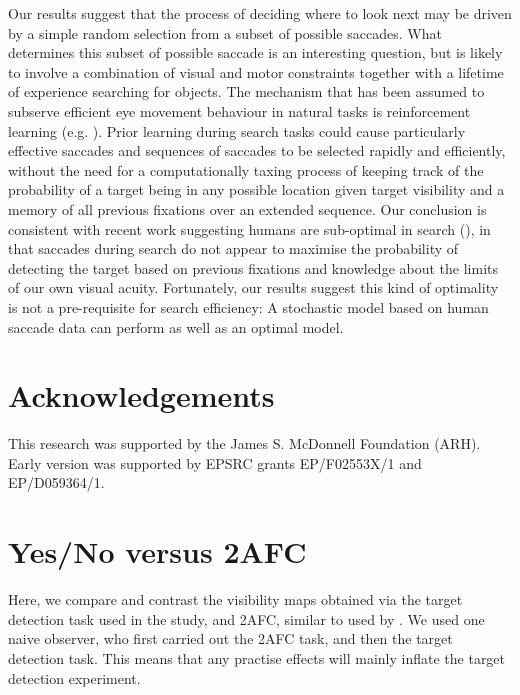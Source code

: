 \documentclass[man]{apa6}
\begin{document}
\par

Our results suggest that the process of deciding where to look next may be driven by a simple random selection from a subset of possible saccades. What determines this subset of possible saccade is an interesting question, but is likely to involve a combination of visual and motor constraints together with a lifetime of experience searching for objects. The mechanism that has been assumed to subserve efficient eye movement behaviour in natural tasks is reinforcement learning (e.g. \textcite{hayhoe2014}). Prior learning during search tasks could cause particularly effective saccades and sequences of saccades to be selected rapidly and efficiently, without the need for a computationally taxing process of keeping track of the probability of a target being in any possible location given target visibility and a memory of all previous fixations over an extended sequence. Our conclusion is consistent with recent work suggesting humans are sub-optimal in search (\textcite{morvan2012, verghese2012, zhang2012}), in that saccades during search do not appear to maximise the probability of detecting the target based on previous fixations and knowledge about the limits of our own visual acuity. Fortunately, our results suggest this kind of optimality is not a pre-requisite for search efficiency: A stochastic model based on human saccade data can perform as well as an optimal model.

\section*{Acknowledgements}
This research was supported by the James S. McDonnell Foundation (ARH). Early version was supported by EPSRC grants EP/F02553X/1 and EP/D059364/1. 


\printbibliography

\appendix
\section{Yes/No versus 2AFC}
\label{app:2afc}

Here, we compare and contrast the visibility maps obtained via the target detection task used in the study, and 2AFC, similar to used by \textcite{najemnik-geisler2005, najemnik-geisler2008}. We used one naive observer, who first carried out the 2AFC task, and then the target detection task. This means that any practise effects will mainly inflate the target detection experiment. 
\end{document}
